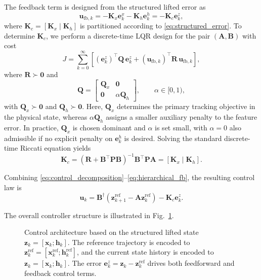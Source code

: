 \documentclass[journal]{IEEEtran}
\newcommand{\vx}{\mathbf{x}}
\newcommand{\vu}{\mathbf{u}}
\newcommand{\vz}{\mathbf{z}}
\newcommand{\vh}{\mathbf{h}}
\newcommand{\ve}{\mathbf{e}}
\newcommand{\mA}{\mathbf{A}}
\newcommand{\mB}{\mathbf{B}}
\newcommand{\mQ}{\mathbf{Q}}
\newcommand{\mR}{\mathbf{R}}
\newcommand{\mP}{\mathbf{P}}
\newcommand{\mK}{\mathbf{K}}
\begin{document}
The feedback term is designed from the structured lifted error as
\begin{equation}
    \vu_{\mathrm{fb},k}
    =
    -\mK_x \ve_k^x - \mK_h \ve_k^h
    =
    -\mK_c \ve_k^z,
    \label{eq:hierarchical_fb}
\end{equation}
where $\mK_c = [\mK_x\;|\;\mK_h]$ is partitioned according to \eqref{eq:structured_error}. To determine $\mK_c$, we perform a discrete-time LQR design for the pair $(\mA,\mB)$ with cost
\begin{equation}
    J = \sum_{k=0}^{\infty}
    \left[
        (\ve_k^z)^\top \mQ\,\ve_k^z
        +
        (\vu_{\mathrm{fb},k})^\top \mR\,\vu_{\mathrm{fb},k}
    \right],
    \label{eq:lqr_objective}
\end{equation}
where $\mR \succ \mathbf{0}$ and
\begin{equation}
    \mQ =
    \begin{bmatrix}
        \mQ_x & \mathbf{0} \\
        \mathbf{0} & \alpha \mQ_h
    \end{bmatrix},
    \qquad \alpha \in [0,1),
    \label{eq:block_diag_Q}
\end{equation}
with $\mQ_x \succ \mathbf{0}$ and $\mQ_h \succ \mathbf{0}$. Here, $\mQ_x$ determines the primary tracking objective in the physical state, whereas $\alpha \mQ_h$ assigns a smaller auxiliary penalty to the feature error. In practice, $\mQ_x$ is chosen dominant and $\alpha$ is set small, with $\alpha = 0$ also admissible if no explicit penalty on $\ve_k^h$ is desired. Solving the standard discrete-time Riccati equation yields
\begin{equation}
    \mK_c
    =
    (\mR + \mB^\top \mP \mB)^{-1} \mB^\top \mP \mA
    =
    [\mK_x\;|\;\mK_h].
    \label{eq:lqr_gain}
\end{equation}

Combining \eqref{eq:control_decomposition}--\eqref{eq:hierarchical_fb}, the resulting control law is
\begin{equation}
    \vu_k
    =
    \mB^\dagger \!\left(\vz_{k+1}^{\mathrm{ref}} - \mA \vz_k^{\mathrm{ref}}\right)
    - \mK_c \ve_k^z.
    \label{eq:full_ctrl}
\end{equation}

The overall controller structure is illustrated in Fig.~\ref{fig:control_architecture}.

\begin{figure}[!t]
    \centering
    \caption{Control architecture based on the structured lifted state $\vz_k=[\vx_k;\vh_k]$. The reference trajectory is encoded to $\vz_k^{\mathrm{ref}}=[\vx_k^{\mathrm{ref}};\vh_k^{\mathrm{ref}}]$, and the current state history is encoded to $\vz_k=[\vx_k;\vh_k]$. The error $\ve_k^z = \vz_k - \vz_k^{\mathrm{ref}}$ drives both feedforward and feedback control terms.}
    \label{fig:control_architecture}
\end{figure}
\end{document}
